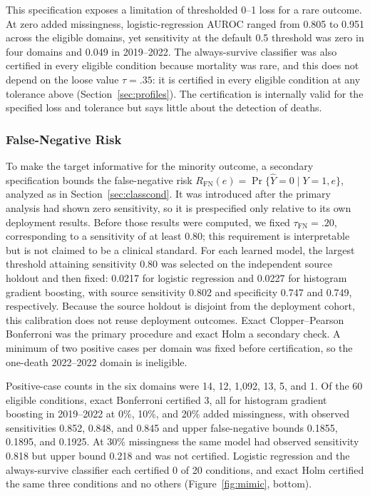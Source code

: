 \documentclass[twoside,11pt]{article}
\begin{document}
This specification exposes a limitation of thresholded 0--1 loss for a rare outcome. At zero
added missingness, logistic-regression AUROC ranged from 0.805 to 0.951 across the eligible
domains, yet sensitivity at the default 0.5 threshold was zero in four domains and 0.049 in
2019--2022. The always-survive classifier was also certified in every eligible condition
because mortality was rare, and this does not depend on the loose value $\tau=.35$: it is
certified in every eligible condition at any tolerance above \MimicAlwaysFull{}
(Section~\ref{sec:profiles}). The certification is internally valid for the specified loss and
tolerance but says little about the detection of deaths.

\subsubsection{False-Negative Risk}
To make the target informative for the minority outcome, a secondary specification bounds the
false-negative risk $R_{\mathrm{FN}}(e)=\Pr\{\widehat Y=0\mid Y=1,e\}$, analyzed as in
Section~\ref{sec:classcond}. It was introduced after the primary analysis had shown zero
sensitivity, so it is prespecified only relative to its own deployment results. Before those
results were computed, we fixed $\tau_{\mathrm{FN}}=.20$, corresponding to a sensitivity of at
least 0.80; this requirement is interpretable but is not claimed to be a clinical standard. For
each learned model, the largest threshold attaining sensitivity 0.80 was selected on the
independent source holdout and then fixed: 0.0217 for logistic regression and 0.0227 for
histogram gradient boosting, with source sensitivity 0.802 and specificity 0.747 and 0.749,
respectively. Because the source holdout is disjoint from the deployment cohort, this
calibration does not reuse deployment outcomes. Exact Clopper--Pearson Bonferroni was the
primary procedure and exact Holm a secondary check. A minimum of two positive cases per domain
was fixed before certification, so the one-death 2022--2022 domain is ineligible.

Positive-case counts in the six domains were 14, 12, 1,092, 13, 5, and 1. Of the 60 eligible
conditions, exact Bonferroni certified 3, all for histogram gradient boosting in 2019--2022 at
0\%, 10\%, and 20\% added missingness, with observed sensitivities 0.852, 0.848, and 0.845 and
upper false-negative bounds 0.1855, 0.1895, and 0.1925. At 30\% missingness the same model had
observed sensitivity 0.818 but upper bound 0.218 and was not certified. Logistic regression
and the always-survive classifier each certified 0 of 20 conditions, and exact Holm certified
the same three conditions and no others (Figure~\ref{fig:mimic}, bottom).
\end{document}

